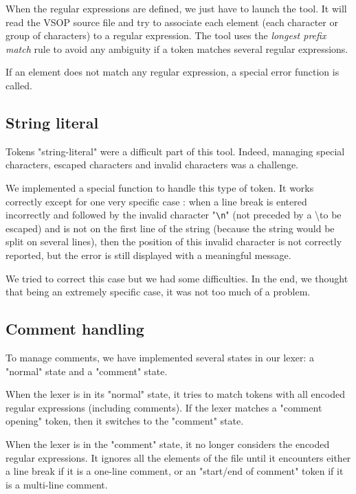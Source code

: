 \documentclass[a4paper, 12pt]{article}
\begin{document}
    When the regular expressions are defined, we just have to launch the tool. It will read the VSOP source file and try to associate each element (each character or group of characters) to a regular expression. The tool uses the {\it longest prefix match} rule to avoid any ambiguity if a token matches several regular expressions.
    
    If an element does not match any regular expression, a special error function is called.
    
    \subsection{String literal}
    
    Tokens "string-literal" were a difficult part of this tool. Indeed, managing special characters, escaped characters and invalid characters was a challenge.
    
    We implemented a special function to handle this type of token. It works correctly except for one very specific case : when a line break is entered incorrectly and followed by the invalid character "\texttt{\textbackslash n}" (not preceded by a \textbackslash to be escaped) and is not on the first line of the string (because the string would be split on several lines), then the position of this invalid character is not correctly reported, but the error is still displayed with a meaningful message.
    
    We tried to correct this case but we had some difficulties. In the end, we thought that being an extremely specific case, it was not too much of a problem.
    
    \subsection{Comment handling}
    
    To manage comments, we have implemented several states in our lexer: a "normal" state and a "comment" state.
    
    When the lexer is in its "normal" state, it tries to match tokens with all encoded regular expressions (including comments). If the lexer matches a "comment opening" token, then it switches to the "comment" state.
    
    When the lexer is in the "comment" state, it no longer considers the encoded regular expressions. It ignores all the elements of the file until it encounters either a line break if it is a one-line comment, or an "start/end of comment" token if it is a multi-line comment.
    
\end{document}
